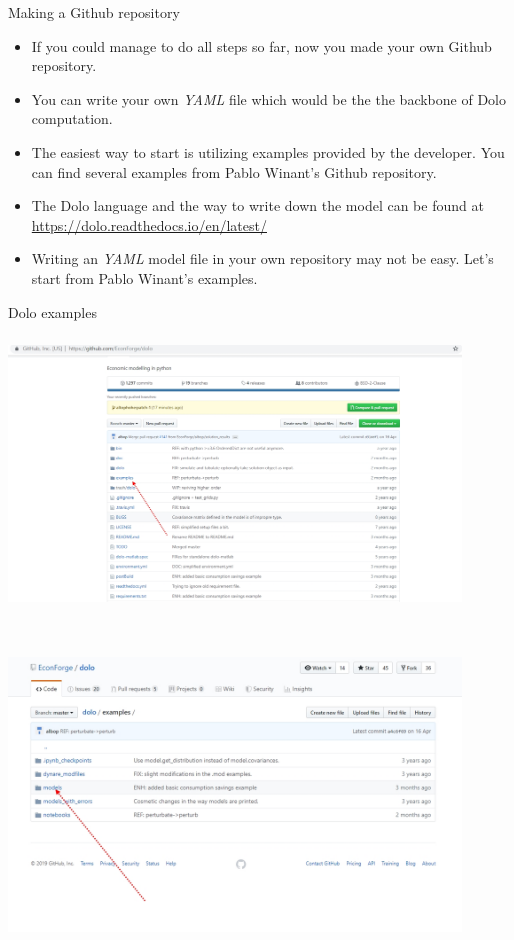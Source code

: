 \documentclass{beamer}
\begin{document}
\begin{frame}{Making a Github repository}
    \begin{itemize}
    \item If you could manage to do all steps so far, now you made your own Github repository. 
    \item You can write your own \textit{YAML} file which would be the the backbone of Dolo computation.
        \item The easiest way to start is utilizing examples provided by the developer. You can find several examples from Pablo Winant's Github repository. 
        \item The Dolo language and the way to write down the model can be found at \url{https://dolo.readthedocs.io/en/latest/}
        \item Writing an \textit{YAML} model file in your own repository may not be easy. Let's start from Pablo Winant's examples. 
    \end{itemize}
\end{frame}
    \begin{frame}{Dolo examples}
 \includegraphics[width=12cm, height= 8cm]{dolo5.jpg}
    \end{frame}
    \begin{frame}{}
         \includegraphics[width=12cm, height= 8cm]{dolo6.jpg}
    \end{frame}
\end{document}
